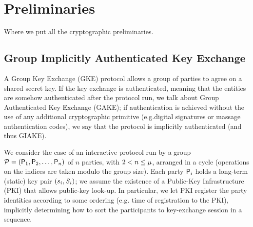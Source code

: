\section{Preliminaries}\label{sec:preliminaries}
Where we put all the cryptographic preliminaries.

\subsection{Group Implicitly Authenticated Key Exchange}\label{subsec:GIAKE}
A Group Key Exchange (GKE) protocol allows a group of parties to agree on a shared secret key. 
If the key exchange is authenticated, meaning that the entities are somehow authenticated after the protocol run, we talk about Group Authenticated Key Exchange (GAKE); if authentication is achieved without the use of any additional cryptographic primitive (e.g.digital signatures or massage authentication codes), we say that the protocol is implicitly authenticated (and thus GIAKE).

We consider the case of an interactive protocol run by a group $\PartySet = (\Party_1,\allowbreak \Party_2,\dots,\Party_n)$ of $n$ parties, with $2 < n \leq \projectKey$, arranged in a cycle (operations on the indices are taken modulo the group size).
Each party $\User[i]$ holds a long-term (static) key pair $(\ssk_i,\spk_i)$; we assume the existence of a Public-Key Infrastructure (PKI) that allows public-key look-up.
In particular, we let PKI register the party identities according to some ordering (e.g. time of registration to the PKI), implicitly determining how to sort the participants to key-exchange session in a sequence.

